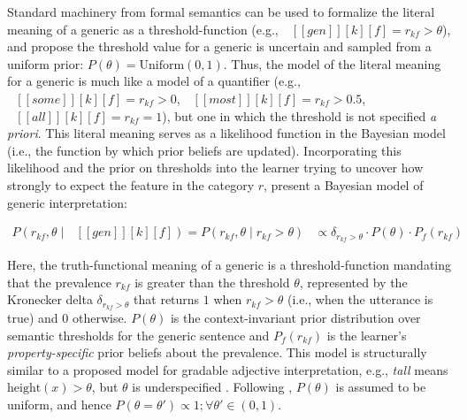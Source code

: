 \documentclass[floatsintext,man]{apa6}
\newcommand{\denote}[1]{\mbox{ $[\![ #1 ]\!]$}}
\begin{document}
 
Standard machinery from formal semantics \cite{Montague1973} can be used to formalize the literal meaning of a generic as a threshold-function  (e.g., \(\mbox{ $[\![ gen ]\!][k][f]$} = r_{kf} > \theta\)), and  propose the threshold value for a generic is uncertain and sampled from a uniform prior: $P(\theta) = \text{Uniform}(0, 1)$. Thus, the model of the literal meaning for a generic is much like a model of a quantifier  (e.g., \(\mbox{ $[\![ some ]\!][k][f]$} = r_{kf} > 0\), \(\mbox{ $[\![ most ]\!][k][f]$} = r_{kf} > 0.5\), \(\mbox{ $[\![ all ]\!][k][f]$} = r_{kf} = 1\)), but one in which the threshold is not specified \emph{a priori}. 
This literal meaning serves as a likelihood function in the Bayesian model (i.e., the function by which prior beliefs are updated). Incorporating this likelihood and the prior on thresholds into the learner trying to uncover how strongly to expect the feature in the category $r$,  present a Bayesian model of generic interpretation: 

\begin{align}
P (r_{kf}, \theta \mid \denote{gen}[k][f]) = P (r_{kf}, \theta \mid r_{kf} >  \theta) &\propto \delta_{r_{kf} > \theta} \cdot P(\theta) \cdot P_f(r_{kf})  \label{eq:L0}
\end{align}


Here, the truth-functional meaning of a generic is a threshold-function mandating that the prevalence $r_{kf}$ is greater than the threshold \(\theta\), represented by the Kronecker delta $\delta_{r_{kf} > \theta}$ that returns \(1\) when \(r_{kf} > \theta\) (i.e., when the utterance is true) and \(0\) otherwise.
$P(\theta)$ is the context-invariant prior distribution over semantic thresholds for the generic sentence and $P_{f}(r_{kf})$ is the learner's \emph{property-specific} prior beliefs about the prevalence.
This model is structurally similar to a proposed model for gradable adjective interpretation, e.g., \emph{tall} means $\text{height}(x) > \theta$, but $\theta$ is underspecified \cite{Lassiter2015}.
Following , $P(\theta)$ is assumed to be uniform, and hence $P(\theta = \theta') \propto 1; \forall \theta' \in (0, 1)$. 
\end{document}
